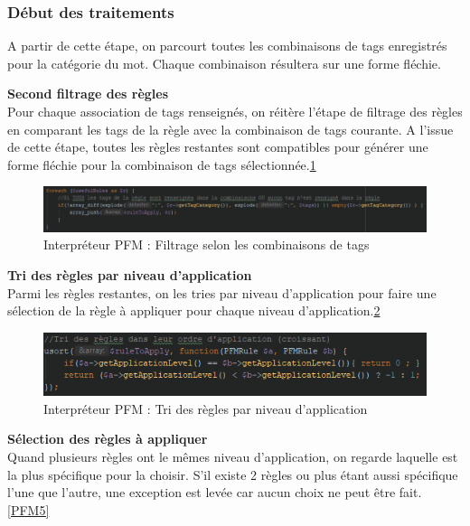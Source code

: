 \documentclass[12pt,a4paper]{article}
\begin{document}
\subsubsection{Début des traitements}
A partir de cette étape, on parcourt toutes les combinaisons de tags enregistrés pour la catégorie du mot. Chaque combinaison résultera sur une forme fléchie.

\textbf{Second filtrage des règles} \\
Pour chaque association de tags renseignés, on réitère l'étape de filtrage des règles en comparant les tags de la règle avec la combinaison de tags courante.
A l'issue de cette étape, toutes les règles restantes sont compatibles pour générer une forme fléchie pour la combinaison de tags sélectionnée.\ref{PFM3}

\begin{figure}[h]
\centering
\includegraphics[width=150mm]{img/interpreteur_Filtrage2.PNG}
\caption{Interpréteur PFM : Filtrage selon les combinaisons de tags}
\label{PFM3}
\end{figure}

\textbf{Tri des règles par niveau d'application} \\
Parmi les règles restantes, on les tries par niveau d'application pour faire une sélection de la règle à appliquer pour chaque niveau d'application.\ref{PFM4}

\begin{figure}[h]
\centering
\includegraphics[width=150mm]{img/interpreteur_tri.PNG}
\caption{Interpréteur PFM : Tri des règles par niveau d'application}
\label{PFM4}
\end{figure}

\textbf{Sélection des règles à appliquer} \\
Quand plusieurs règles ont le mêmes niveau d'application, on regarde laquelle est la plus spécifique pour la choisir.
S'il existe 2 règles ou plus étant aussi spécifique l'une que l'autre, une exception est levée car aucun choix ne peut être fait.\ref{PFM5}
\end{document}
